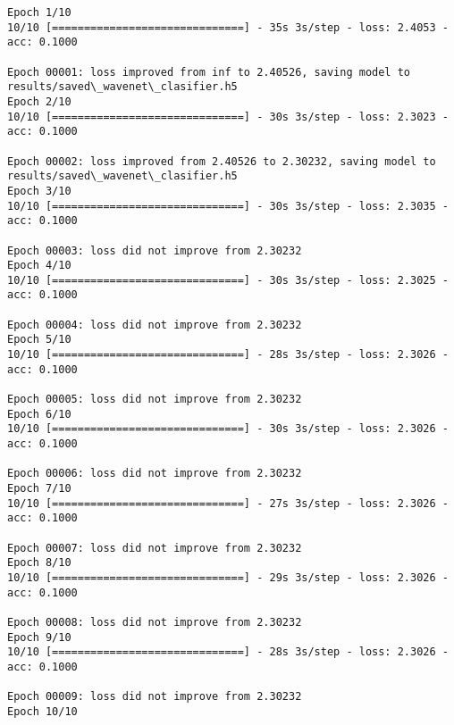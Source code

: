 \documentclass[11pt]{article}
\begin{document}
    \begin{Verbatim}[commandchars=\\\{\}]
Epoch 1/10
10/10 [==============================] - 35s 3s/step - loss: 2.4053 - acc: 0.1000

Epoch 00001: loss improved from inf to 2.40526, saving model to results/saved\_wavenet\_clasifier.h5
Epoch 2/10
10/10 [==============================] - 30s 3s/step - loss: 2.3023 - acc: 0.1000

Epoch 00002: loss improved from 2.40526 to 2.30232, saving model to results/saved\_wavenet\_clasifier.h5
Epoch 3/10
10/10 [==============================] - 30s 3s/step - loss: 2.3035 - acc: 0.1000

Epoch 00003: loss did not improve from 2.30232
Epoch 4/10
10/10 [==============================] - 30s 3s/step - loss: 2.3025 - acc: 0.1000

Epoch 00004: loss did not improve from 2.30232
Epoch 5/10
10/10 [==============================] - 28s 3s/step - loss: 2.3026 - acc: 0.1000

Epoch 00005: loss did not improve from 2.30232
Epoch 6/10
10/10 [==============================] - 30s 3s/step - loss: 2.3026 - acc: 0.1000

Epoch 00006: loss did not improve from 2.30232
Epoch 7/10
10/10 [==============================] - 27s 3s/step - loss: 2.3026 - acc: 0.1000

Epoch 00007: loss did not improve from 2.30232
Epoch 8/10
10/10 [==============================] - 29s 3s/step - loss: 2.3026 - acc: 0.1000

Epoch 00008: loss did not improve from 2.30232
Epoch 9/10
10/10 [==============================] - 28s 3s/step - loss: 2.3026 - acc: 0.1000

Epoch 00009: loss did not improve from 2.30232
Epoch 10/10

    \end{Verbatim}
\end{document}
